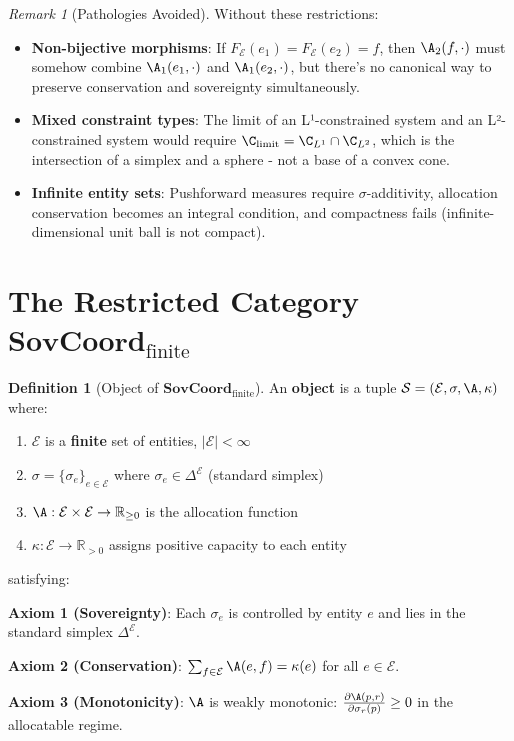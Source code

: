 \documentclass[11pt,a4paper]{article}
\theoremstyle{definition}
\newtheorem{definition}[theorem]{Definition}
\theoremstyle{remark}
\newtheorem{remark}[theorem]{Remark}
\newcommand{\E}{\mathcal{E}}
\newcommand{\SovCoord}{\mathbf{SovCoord}}
\begin{document}
\begin{remark}[Pathologies Avoided]
Without these restrictions:
\begin{itemize}
\item \textbf{Non-bijective morphisms}: If $F_\E(e_1) = F_\E(e_2) = f$, then $\A_2(f, \cdot)$ must somehow combine $\A_1(e_1, \cdot)$ and $\A_1(e_2, \cdot)$, but there's no canonical way to preserve conservation and sovereignty simultaneously.

\item \textbf{Mixed constraint types}: The limit of an L¹-constrained system and an L²-constrained system would require $\C_{\text{limit}} = \C_{L^1} \cap \C_{L^2}$, which is the intersection of a simplex and a sphere - not a base of a convex cone.

\item \textbf{Infinite entity sets}: Pushforward measures require $\sigma$-additivity, allocation conservation becomes an integral condition, and compactness fails (infinite-dimensional unit ball is not compact).
\end{itemize}
\end{remark}

\section{The Restricted Category $\SovCoord_{\text{finite}}$}

\begin{definition}[Object of $\SovCoord_{\text{finite}}$]
An \textbf{object} is a tuple $\mathcal{S} = (\E, \sigma, \A, \kappa)$ where:
\begin{enumerate}
\item $\E$ is a \textbf{finite} set of entities, $|\E| < \infty$
\item $\sigma = \{\sigma_e\}_{e \in \E}$ where $\sigma_e \in \Delta^{\E}$ (standard simplex)
\item $\A: \E \times \E \to \mathbb{R}_{\ge 0}$ is the allocation function
\item $\kappa: \E \to \mathbb{R}_{> 0}$ assigns positive capacity to each entity
\end{enumerate}

satisfying:

\textbf{Axiom 1 (Sovereignty)}: Each $\sigma_e$ is controlled by entity $e$ and lies in the standard simplex $\Delta^{\E}$.

\textbf{Axiom 2 (Conservation)}: $\sum_{f \in \E} \A(e,f) = \kappa(e)$ for all $e \in \E$.

\textbf{Axiom 3 (Monotonicity)}: $\A$ is weakly monotonic: $\frac{\partial \A(p,r)}{\partial \sigma_r(p)} \geq 0$ in the allocatable regime.
\end{definition}
\end{document}
